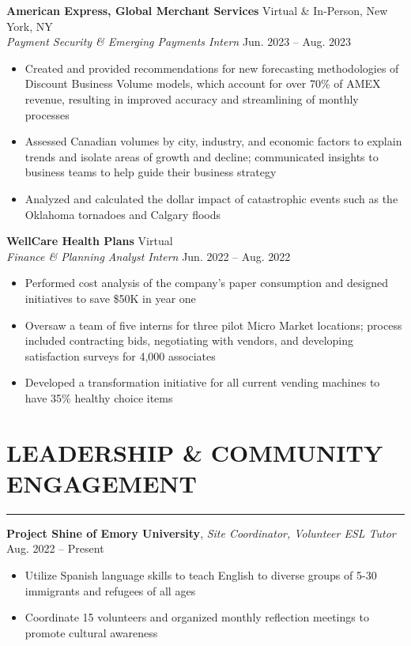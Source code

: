 \documentclass[10.5pt]{article}
\begin{document}
\noindent
\textbf{American Express, Global Merchant Services} \hfill Virtual \& In-Person, New York, NY\\
\emph{Payment Security \& Emerging Payments Intern} \hfill Jun. 2023 -- Aug. 2023
\begin{itemize}
    \item Created and provided recommendations for new forecasting methodologies of Discount Business Volume models, which account for over 70\% of AMEX revenue, resulting in improved accuracy and streamlining of monthly processes
    \item Assessed Canadian volumes by city, industry, and economic factors to explain trends and isolate areas of growth and decline; communicated insights to business teams to help guide their business strategy
    \item Analyzed and calculated the dollar impact of catastrophic events such as the Oklahoma tornadoes and Calgary floods
\end{itemize}

\noindent
\textbf{WellCare Health Plans} \hfill Virtual\\
\emph{Finance \& Planning Analyst Intern} \hfill Jun. 2022 -- Aug. 2022
\begin{itemize}[itemsep=0pt]
    \item Performed cost analysis of the company's paper consumption and designed initiatives to save \$50K in year one
    \item Oversaw a team of five interns for three pilot Micro Market locations; process included contracting bids, negotiating with vendors, and developing satisfaction surveys for 4,000 associates
    \item Developed a transformation initiative for all current vending machines to have 35\% healthy choice items
\end{itemize}

\section*{\large\textbf{LEADERSHIP \& COMMUNITY ENGAGEMENT}}
\vspace{-\baselineskip}
\noindent\rule{\textwidth}{0.4pt}

\noindent
\textbf{Project Shine of Emory University}, \emph{Site Coordinator, Volunteer ESL Tutor} \hfill Aug. 2022 -- Present
\begin{itemize}[itemsep=0pt]
    \item Utilize Spanish language skills to teach English to diverse groups of 5-30 immigrants and refugees of all ages
    \item Coordinate 15 volunteers and organized monthly reflection meetings to promote cultural awareness
\end{itemize}
\end{document}
